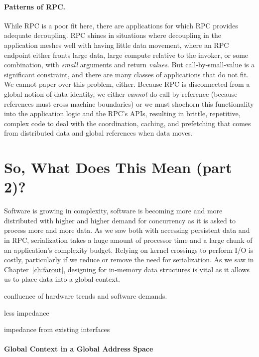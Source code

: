 \paragraph*{Patterns of RPC.}
%
While RPC is a poor fit here, there are applications for which RPC provides adequate decoupling.
RPC shines in situations where decoupling in the application meshes well with having little data
movement, where an RPC endpoint either fronts large data, large compute relative to the invoker, or
some combination, with \emph{small} arguments and return \emph{values}.
But call-by-small-value is a significant constraint, and there are many
classes of applications that do not fit.
We cannot paper over this problem, either.
Because
RPC is disconnected from a global notion of data identity, we either \emph{cannot} do
call-by-reference (because references must cross machine boundaries) or we must shoehorn this
functionality into the application logic and the RPC's APIs, resulting in brittle, repetitive,
complex code to deal with the coordination, caching, and prefetching that
comes from distributed data and global references when data moves.




\section{So, What Does This Mean (part 2)?}

Software is growing in complexity, software is becoming more and more distributed with higher and higher demand for
concurrency as it is asked to process more and more data.
As we saw both with accessing persistent data and in RPC, serialization takes a huge amount of processor time and a
large chunk of an application's complexity budget. Relying on kernel crossings to perform I/O is costly, particularly if
we reduce or remove the need for serialization. As we saw in Chapter~\ref{ch:farout}, designing for in-memory data
structures is vital as it allows us to place data into a global context.

confluence of hardware trends and software demands.

less impedance

impedance from existing interfaces



\paragraph{Global Context in a Global Address Space}


